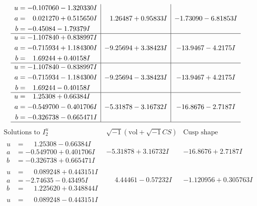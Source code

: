 \documentclass[1p]{elsarticle_modified}
\theoremstyle{definition}
\newcommand{\I}{\sqrt{-1}}
\begin{document}
$$\begin{array}{c|c|c}
\begin{aligned}
u &= -0.107060 - 1.320330 I \\
a &= \phantom{-}0.021270 + 0.515650 I \\
b &= -0.45084 - 1.79379 I\end{aligned}
 & \phantom{-}1.26487 + 0.95833 I & -1.73090 - 6.81853 I \\ \hline\begin{aligned}
u &= -1.107840 + 0.838997 I \\
a &= -0.715934 + 1.184300 I \\
b &= \phantom{-}1.69244 + 0.40158 I\end{aligned}
 & -9.25694 + 3.38423 I & -13.9467 - 4.2175 I \\ \hline\begin{aligned}
u &= -1.107840 - 0.838997 I \\
a &= -0.715934 - 1.184300 I \\
b &= \phantom{-}1.69244 - 0.40158 I\end{aligned}
 & -9.25694 - 3.38423 I & -13.9467 + 4.2175 I \\ \hline\begin{aligned}
u &= \phantom{-}1.25308 + 0.66384 I \\
a &= -0.549700 - 0.401706 I \\
b &= -0.326738 - 0.665471 I\end{aligned}
 & -5.31878 - 3.16732 I & -16.8676 - 2.7187 I\\
 \hline 
 \end{array}$$\newpage$$\begin{array}{c|c|c}  
\text{Solutions to }I^u_{2}& \I (\text{vol} + \sqrt{-1}CS) & \text{Cusp shape}\\
 \hline 
\begin{aligned}
u &= \phantom{-}1.25308 - 0.66384 I \\
a &= -0.549700 + 0.401706 I \\
b &= -0.326738 + 0.665471 I\end{aligned}
 & -5.31878 + 3.16732 I & -16.8676 + 2.7187 I \\ \hline\begin{aligned}
u &= \phantom{-}0.089248 + 0.443151 I \\
a &= -2.74635 - 0.43495 I \\
b &= \phantom{-}1.225620 + 0.348844 I\end{aligned}
 & \phantom{-}4.44461 - 0.57232 I & -1.120956 + 0.305763 I \\ \hline\begin{aligned}
u &= \phantom{-}0.089248 - 0.443151 I \\

\end{aligned}
\end{array}$$
\end{document}
